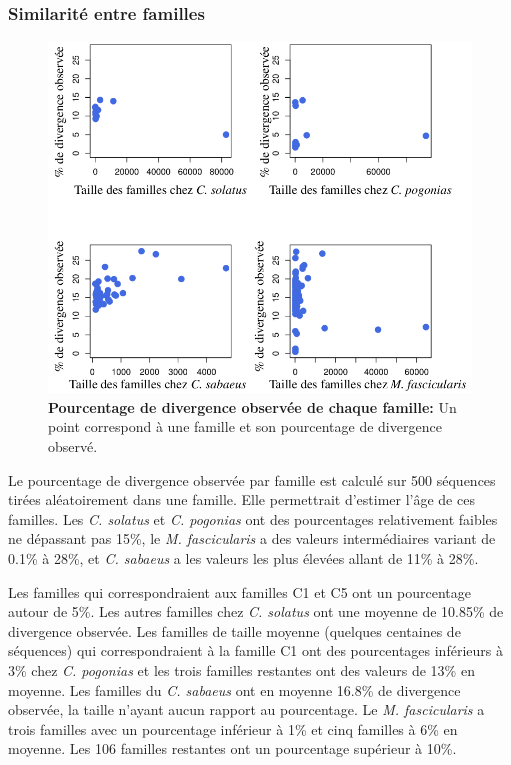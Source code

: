 \documentclass[12pt,a4paper]{article}
\begin{document}
			\subsubsection{Similarité entre familles}
\begin{figure}	
	\center
	\includegraphics[scale=0.4]{img/graphique_similarity.png}
	\caption{\textbf{Pourcentage de divergence observée de chaque famille:}
	Un point correspond à une famille et son pourcentage de divergence observé.
	\label{fig:divergence}
		} 
\end{figure}
	Le pourcentage de divergence observée par famille est calculé sur 500 séquences tirées aléatoirement dans une famille. Elle permettrait d'estimer l'âge de ces familles. Les \textit{C. solatus} et \textit{C. pogonias} ont des pourcentages relativement faibles ne dépassant pas 15\%, le \textit{M. fascicularis} a des valeurs intermédiaires variant de 0.1\% à 28\%, et \textit{C. sabaeus} a les valeurs les plus élevées allant de 11\% à 28\%.
	
	Les familles qui correspondraient aux familles C1 et C5 ont un pourcentage autour de 5\%. Les autres familles chez \textit{C. solatus} ont une moyenne de 10.85\% de divergence observée. Les familles de taille moyenne (quelques centaines de séquences) qui correspondraient à la famille C1 ont des pourcentages inférieurs à 3\% chez \textit{C. pogonias} et les trois familles restantes ont des valeurs de 13\% en moyenne. Les familles du \textit{C. sabaeus} ont en moyenne 16.8\% de divergence observée, la taille n'ayant aucun rapport au pourcentage. Le \textit{M. fascicularis} a trois familles avec un pourcentage inférieur à 1\% et cinq familles à 6\% en moyenne. Les 106 familles restantes ont un pourcentage supérieur à 10\%.
	
\end{document}
